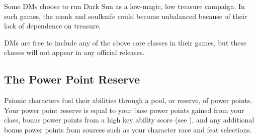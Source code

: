 Some DMs choose to run {\tableheader Dark Sun} as a low-magic, low treasure campaign. In such games, the monk and soulknife could become unbalanced because of their lack of dependence on treasure.

DMs are free to include any of the above core classes in their games, but these classes will not appear in any official releases.

\subsection{The Power Point Reserve}
Psionic characters fuel their abilities through a pool, or reserve, of power points. Your power point reserve is equal to your base power points gained from your class, bonus power points from a high key ability score (see ), and any additional bonus power points from sources such as your character race and feat selections.


